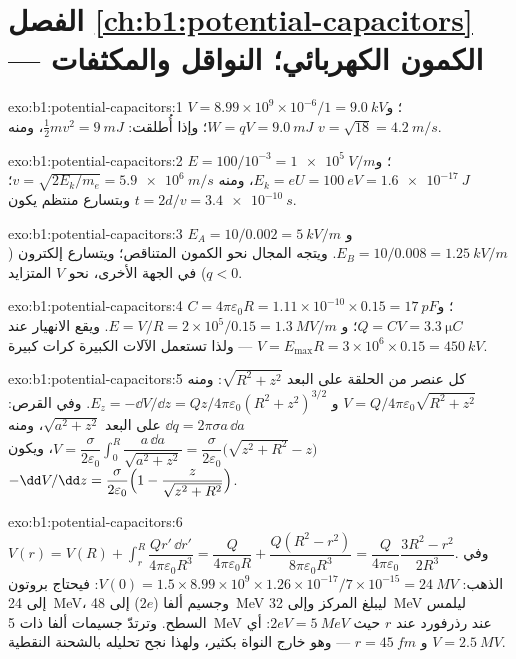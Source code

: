 \section*{الفصل \ref{ch:b1:potential-capacitors} --- الكمون الكهربائي؛ النواقل والمكثفات}

\begin{solution}{exo:b1:potential-capacitors:1}
$V = 8.99 \times 10^9 \times 10^{-6}/1 = \qty{9.0}{kV}$؛ و $W = qV = \qty{9.0}{mJ}$؛
وإذا أُطلقت: $\tfrac12mv^2 = \qty{9}{mJ}$، ومنه $v = \sqrt{18} = \qty{4.2}{m/s}$.
\end{solution}

\begin{solution}{exo:b1:potential-capacitors:2}
$E = 100/10^{-3} = \qty{1e5}{V/m}$؛ و $E_k = eU = \qty{100}{eV} = \qty{1.6e-17}{J}$،
ومنه $v = \sqrt{2E_k/m_e} = \qty{5.9e6}{m/s}$؛ وبتسارع منتظم يكون
$t = 2d/v = \qty{3.4e-10}{s}$.
\end{solution}

\begin{solution}{exo:b1:potential-capacitors:3}
$E_A = 10/0.002 = \qty{5}{kV/m}$ و $E_B = 10/0.008 = \qty{1.25}{kV/m}$. ويتجه
المجال نحو الكمون المتناقص؛ ويتسارع إلكترون ($q < 0$)
في الجهة الأخرى، نحو $V$ المتزايد.
\end{solution}

\begin{solution}{exo:b1:potential-capacitors:4}
$C = 4\pi\varepsilon_0R = 1.11 \times 10^{-10} \times 0.15 = \qty{17}{pF}$؛ و $Q = CV =
\qty{3.3}{\micro C}$؛ و $E = V/R = 2 \times 10^5/0.15 = \qty{1.3}{MV/m}$. ويقع الانهيار
عند $V = E_{\max}R = 3 \times 10^6 \times 0.15 = \qty{450}{kV}$ --- ولذا تستعمل الآلات
الكبيرة كرات كبيرة.
\end{solution}

\begin{solution}{exo:b1:potential-capacitors:5}
كل عنصر من الحلقة على البعد $\sqrt{R^2 + z^2}$: ومنه $V =
Q/4\pi\varepsilon_0\sqrt{R^2 + z^2}$ و $E_z = -\dd V/\dd z = Qz/4\pi\varepsilon_0(R^2 +
z^2)^{3/2}$. وفي القرص: $\dd q = 2\pi\sigma a\,\dd a$ على البعد $\sqrt{a^2 + z^2}$، ومنه $V =
\dfrac{\sigma}{2\varepsilon_0}\displaystyle\int_0^R\dfrac{a\,\dd a}{\sqrt{a^2 + z^2}} =
\dfrac{\sigma}{2\varepsilon_0}\bigl(\sqrt{z^2 + R^2} - z\bigr)$، ويكون $-\dd V/\dd z =
\dfrac{\sigma}{2\varepsilon_0}\Bigl(1 - \dfrac{z}{\sqrt{z^2 + R^2}}\Bigr)$.
\end{solution}

\begin{solution}{exo:b1:potential-capacitors:6}
$V(r) = V(R) + \displaystyle\int_r^R\dfrac{Qr'\,\dd r'}{4\pi\varepsilon_0R^3} =
\dfrac{Q}{4\pi\varepsilon_0R} + \dfrac{Q(R^2 - r^2)}{8\pi\varepsilon_0R^3} = \dfrac{Q}{4\pi\varepsilon_0}
\dfrac{3R^2 - r^2}{2R^3}$. وفي الذهب: $V(0) = 1.5 \times 8.99 \times 10^9 \times 1.26 \times
10^{-17}/7 \times 10^{-15} = \qty{24}{MV}$: فيحتاج بروتون إلى \qty{24}{MeV}، وجسيم ألفا
($2e$) إلى \qty{48}{MeV} ليبلغ المركز وإلى \qty{32}{MeV} ليلمس
السطح. وترتدّ جسيمات ألفا ذات \qty{5}{MeV} عند رذرفورد عند $r$ حيث $2eV =
\qty{5}{MeV}$: أي $V = \qty{2.5}{MV}$ و $r = \qty{45}{fm}$ --- وهو خارج النواة
بكثير، ولهذا نجح تحليله بالشحنة النقطية.
\end{solution}

